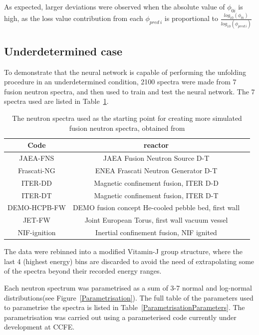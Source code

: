 \documentclass[a4paper, 12pt]{article}
\begin{document}
    As expected, larger deviations were observed when the absolute value of $\phi_{0i}$ is high, as the loss value contribution from each $\phi_{pred\:i}$ is proportional to $\frac{log_{10}(\phi_{0i})}{log_{10}(\phi_{pred\:i})}$

\subsection{Underdetermined case}\label{Underdetermined case}
    To demonstrate that the neural network is capable of performing the unfolding procedure in an underdetermined condition, 2100 spectra were made from 7 fusion neutron spectra, and then used to train and test the neural network. The 7 spectra used are listed in Table~\ref{DataAugmentationSource}.

    \begin{table}
    \begin{tabularx}{\textwidth}{ccX}
    Code & reactor\\
    \hline
    JAEA-FNS & JAEA Fusion Neutron Source D-T\\
    Frascati-NG & ENEA Frascati Neutron Generator D-T\\
    ITER-DD & Magnetic confinement fusion, ITER D-D\\
    ITER-DT & Magnetic confinement fusion, ITER D-T\\
    DEMO-HCPB-FW & DEMO fusion concept He-cooled pebble bed, first wall\\
    JET-FW & Joint European Torus, first wall vacuum vessel\\
    NIF-ignition & Inertial confinement fusion, NIF ignited\\
    \end{tabularx}
    \caption{The neutron spectra used as the starting point for creating more simulated fusion neutron spectra, obtained from \cite{FISPACT_reference_spectra} }\label{DataAugmentationSource}
    \end{table}
    The data were rebinned into a modified Vitamin-J group structure, where the last 4 (highest energy) bins are discarded to avoid the need of extrapolating some of the spectra beyond their recorded energy ranges.

    Each neutron spectrum was parametrised as a sum of 3-7 normal and log-normal distributions(see Figure~\ref{Parametrisation}). The full table of the parameters used to parametrise the spectra is listed in Table~\ref{ParametrisationParameters}. The parametrisation was carried out using a parameterised code currently under development at CCFE.
\end{document}
